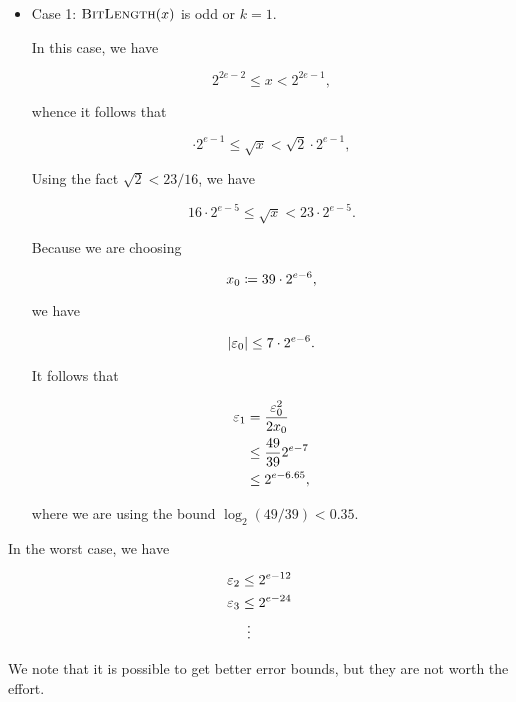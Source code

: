\begin{itemize}
\item Case 1: $\textsc{BitLength}(x)$ is odd or $k=1$.

In this case, we have

\begin{equation}
    2^{2e-2} \le x < 2^{2e-1},
\end{equation}

\noindent
whence it follows that

\begin{equation}
    \cdot2^{e-1} \le \sqrt{x} < \sqrt{2}\cdot2^{e-1},
\end{equation}

\noindent
Using the fact $\sqrt{2} < 23/16$, we have

\begin{equation}
    16\cdot2^{e-5} \le \sqrt{x} < 23\cdot2^{e-5}.
\end{equation}

\noindent
Because we are choosing

\begin{equation}
    x_{0} \coloneqq{} 39\cdot2^{e-6},
\end{equation}

\noindent
we have

\begin{equation}
    \left| \varepsilon_{0} \right| \le 7\cdot2^{e-6}.
\end{equation}

It follows that

\begin{align}
    \varepsilon_{1} &= \frac{\varepsilon_{0}^{2}}{2x_{0}} \nonumber\\
        &\le \frac{49}{39}2^{e-7} \nonumber\\
        &\le 2^{e-6.65},
\end{align}

\noindent
where we are using the bound $\log_{2}(49/39) < 0.35$.
\end{itemize}

In the worst case, we have

\begin{align}
    \varepsilon_{2} &\le 2^{e-12} \nonumber\\
    \varepsilon_{3} &\le 2^{e-24} \nonumber\\
        &\ \vdots
\end{align}

\noindent
We note that it is possible to get better error bounds,
but they are not worth the effort.


\subsubsection{\Linear{}}
\label{app:error_bounds:linear}

